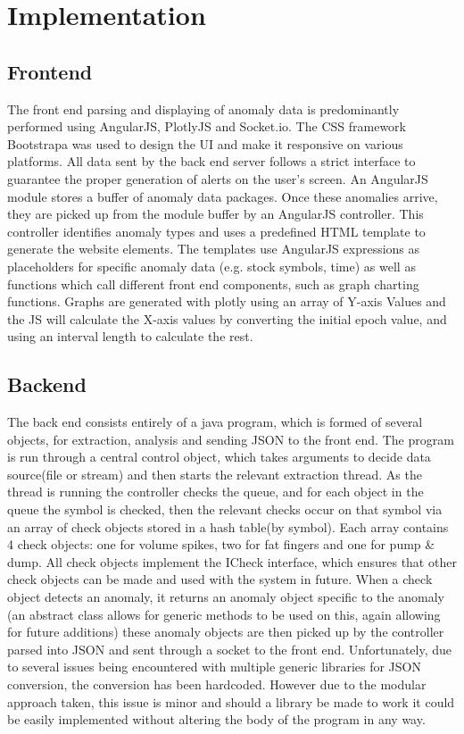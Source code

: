 \documentclass[12pt]{article}
\begin{document}
\section{Implementation}
  \subsection{Frontend}
  The front end parsing and displaying of anomaly data is predominantly performed using AngularJS, PlotlyJS and Socket.io.
  The CSS framework Bootstrapa was used to design the UI and make it responsive on various platforms.
  All data sent by the back end server follows a strict interface to guarantee the proper generation of alerts on the user’s screen. An AngularJS module stores a buffer of anomaly data packages.
  Once these anomalies arrive, they are picked up from the module buffer by an AngularJS controller. This controller identifies anomaly types and uses a predefined HTML template to generate the website elements.
  The templates use AngularJS expressions as placeholders for specific anomaly data (e.g. stock symbols, time) as well as functions which call different front end components, such as graph charting functions.
  Graphs are generated with plotly using an array of Y-axis Values and the JS will calculate the X-axis values by converting the initial epoch value, and using an interval length to calculate the rest.
  \subsection{Backend}
  The back end consists entirely of a java program, which is formed of several objects, for extraction, analysis and sending JSON to the front end.
  The program is run through a central control object, which takes arguments to decide data source(file or stream) and then starts the relevant extraction thread. As the thread is running the controller checks the queue, and for each object in the queue the symbol is checked, then the relevant checks occur on that symbol via an array of check objects stored in a hash table(by symbol).
  Each array contains 4 check objects: one for volume spikes, two for fat fingers and one for pump \& dump. All check objects implement the ICheck interface, which ensures that other check objects can be made and used with the system in future.
  When a check object detects an anomaly, it returns an anomaly object specific to the anomaly (an abstract class allows for generic methods to be used on this, again allowing for future additions) these anomaly objects are then picked up by the controller parsed into JSON and sent through a socket to the front end. Unfortunately, due to several issues being encountered with multiple generic libraries for JSON conversion, the conversion has been hardcoded.
  However due to the modular approach taken, this issue is minor and should a library be made to work it could be easily implemented without altering the body of the program in any way.
\end{document}
